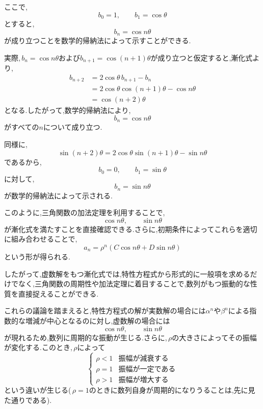   ここで,
  \[
    b_0=1,\qquad b_1=\cos\theta
  \]
  とすると,
  \[
    b_n=\cos n\theta
  \]
  が成り立つことを数学的帰納法によって示すことができる.

  実際,\,$b_n=\cos n\theta$および$b_{n+1}=\cos(n+1)\theta$が成り立つと仮定すると,漸化式より,
  \[
  \begin{aligned}
    b_{n+2}
    &=2\cos\theta\,b_{n+1}-b_n\\
    &=2\cos\theta\cos(n+1)\theta-\cos n\theta\\
    &=\cos(n+2)\theta
  \end{aligned}
  \]
  となる.したがって,数学的帰納法により,
  \[
    b_n=\cos n\theta
  \]
  がすべての$n$について成り立つ.

  同様に,
  \[
    \sin(n+2)\theta
    =2\cos\theta\sin(n+1)\theta-\sin n\theta
  \]
  であるから,
  \[
    b_0=0,\qquad b_1=\sin\theta
  \]
  に対して,
  \[
    b_n=\sin n\theta
  \]
  が数学的帰納法によって示される.

  このように,三角関数の加法定理を利用することで,
  \[
    \cos n\theta,\qquad \sin n\theta
  \]
  が漸化式を満たすことを直接確認できる.さらに,初期条件によってこれらを適切に組み合わせることで,
  \[
    a_n=\rho^n
    (C\cos n\theta+D\sin n\theta)
  \]
  という形が得られる.

  したがって,虚数解をもつ漸化式では,特性方程式から形式的に一般項を求めるだけでなく,三角関数の周期性や加法定理に着目することで,数列がもつ振動的な性質を直接捉えることができる.

  これらの議論を踏まえると,特性方程式の解が実数解の場合には$\alpha^n$や$\beta^n$による指数的な増減が中心となるのに対し,虚数解の場合には
  \[
    \cos n\theta,\qquad\sin n\theta
  \]
  が現れるため,数列に周期的な振動が生じる.さらに,\,$\rho$の大きさによってその振幅が変化する.このとき,\,$\rho$によって
  \[
    \begin{cases}
      \rho<1 & \text{振幅が減衰する}\\
      \rho=1 & \text{振幅が一定である}\\
      \rho>1 & \text{振幅が増大する}
    \end{cases}
  \]
  という違いが生じる(\,$\rho=1$のときに数列自身が周期的になりうることは,先に見た通りである).